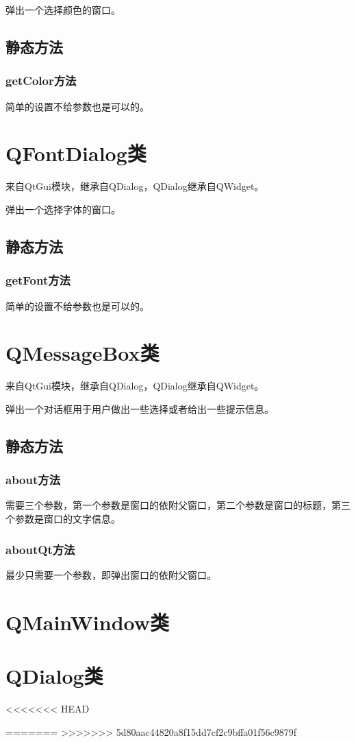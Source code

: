 \documentclass[12pt,oneside]{book}
\begin{document}
\begin{common-format}
弹出一个选择颜色的窗口。

\subsection{静态方法}
\subsubsection{getColor方法}
简单的设置不给参数也是可以的。

\section{QFontDialog类}
来自QtGui模块，继承自QDialog，QDialog继承自QWidget。

弹出一个选择字体的窗口。
\subsection{静态方法}
\subsubsection{getFont方法}
简单的设置不给参数也是可以的。


\section{QMessageBox类}
来自QtGui模块，继承自QDialog，QDialog继承自QWidget。

弹出一个对话框用于用户做出一些选择或者给出一些提示信息。

\subsection{静态方法}
\subsubsection{about方法}
需要三个参数，第一个参数是窗口的依附父窗口，第二个参数是窗口的标题，第三个参数是窗口的文字信息。

\subsubsection{aboutQt方法}
最少只需要一个参数，即弹出窗口的依附父窗口。


\section{QMainWindow类}



\section{QDialog类}

<<<<<<< HEAD

=======
>>>>>>> 5d80aac44820a8f15dd7cf2c9bffa01f56c9879f


\end{common-format}
\end{document}

